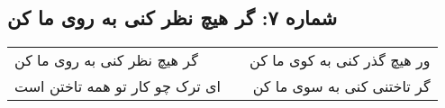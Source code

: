 \begin{center}
\section*{شماره ۷: گر هیچ نظر کنی به روی ما کن}
\label{sec:007}
\begin{longtable}{l p{0.5cm} r}
گر هیچ نظر کنی به روی ما کن
&&
ور هیچ گذر کنی به کوی ما کن
\\
ای ترک چو کار تو همه تاختن است
&&
گر تاختنی کنی به سوی ما کن
\\
\end{longtable}
\end{center}
